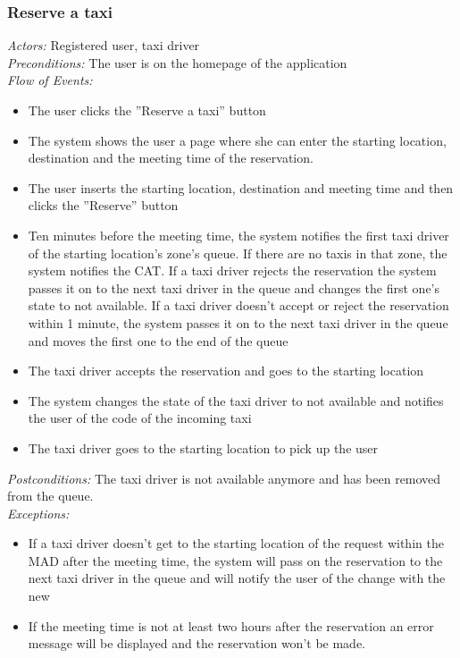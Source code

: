 \documentclass{article}
\begin{document}
	\subsubsection{Reserve a taxi}
	\textit{Actors:} Registered user, taxi driver
	\\\textit{Preconditions:} The user is on the homepage of the application %
	\\\textit{Flow of Events:}
	\begin{itemize}
		\item  The user clicks the ''Reserve a taxi'' button
		\item  The system shows the user a page where she can enter the starting location, destination and the meeting time of the reservation.
		\item  The user inserts the starting location, destination and meeting time and then clicks the ''Reserve'' button
		\item  Ten minutes before the meeting time, the system notifies the first taxi driver of the starting location's zone's queue. If there are no taxis in that zone, the system notifies the CAT\@. If a taxi driver rejects the reservation the system passes it on to the next taxi driver in the queue and changes the first one's state to not available. If a taxi driver doesn't accept or reject the reservation within 1 minute, the system passes it on to the next taxi driver in the queue and moves the first one to the end of the queue
		\item  The taxi driver accepts the reservation and goes to the starting location
		\item  The system changes the state of the taxi driver to not available and notifies the user of the code of the incoming taxi %
		\item  The taxi driver goes to the starting location to pick up the user
	\end{itemize}
	\textit{Postconditions:} The taxi driver is not available anymore and has been removed from the queue. %
	\\\textit{Exceptions:}
	\begin{itemize} 
		\item If a taxi driver doesn't get to the starting location of the request within the MAD after the meeting time, the system will pass on the reservation to the next taxi driver in the queue and will notify the user of the change with the new%
		\item If the meeting time is not at least two hours after the reservation an error message will be displayed and the reservation won't be made.
	\end{itemize}
	
\end{document}
